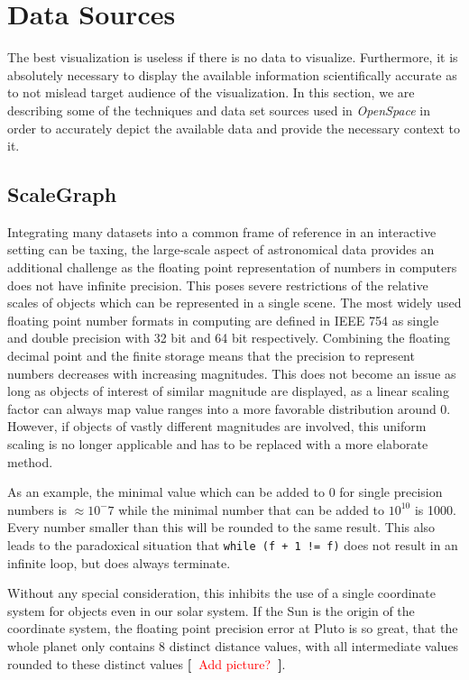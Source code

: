 \documentclass{vgtc}                %
\newcommand{\todo}[1]{\textbf{[~}\textcolor {red}{#1}\marginpar{\textcolor {red}{\centerline{{\Huge \textbf{!}}}}}\textbf{~]}}
\begin{document}
\section*{Data Sources}
The best visualization is useless if there is no data to visualize. Furthermore, it is absolutely necessary to display the available information scientifically accurate as to not mislead target audience of the visualization. In this section, we are describing some of the techniques and data set sources used in \emph{OpenSpace} in order to accurately depict the available data and provide the necessary context to it.

\subsection*{ScaleGraph}
Integrating many datasets into a common frame of reference in an interactive setting can be taxing, the large-scale aspect of astronomical data provides an additional challenge as the floating point representation of numbers in computers does not have infinite precision. This poses severe restrictions of the relative scales of objects which can be represented in a single scene. The most widely used floating point number formats in computing are defined in IEEE 754 as single and double precision with 32 bit and 64 bit respectively. Combining the floating decimal point and the finite storage means that the precision to represent numbers decreases with increasing magnitudes. This does not become an issue as long as objects of interest of similar magnitude are displayed, as a linear scaling factor can always map value ranges into a more favorable distribution around 0. However, if objects of vastly different magnitudes are involved, this uniform scaling is no longer applicable and has to be replaced with a more elaborate method.

As an example, the minimal value which can be added to 0 for single precision numbers is $\approx 10^-7$ while the minimal number that can be added to $10^10$ is 1000. Every number smaller than this will be rounded to the same result. This also leads to the paradoxical situation that \texttt{while (f + 1 != f)} does not result in an infinite loop, but does always terminate.

Without any special consideration, this inhibits the use of a single coordinate system for objects even in our solar system. If the Sun is the origin of the coordinate system, the floating point precision error at Pluto is so great, that the whole planet only contains 8 distinct distance values, with all intermediate values rounded to these distinct values \todo{Add picture?}.
\end{document}
